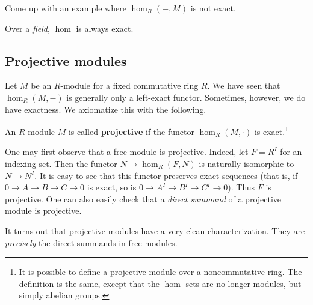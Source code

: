 \begin{exercise}
Come up with an example where $\hom_R(-, M)$ is not exact.
\end{exercise}

\begin{exercise}
Over a \emph{field}, $\hom$ is always exact.
\end{exercise}

\subsection{Projective modules}

Let $M$ be an $R$-module for a fixed commutative ring $R$. We have seen that
$\hom_R(M,-)$ is generally only a left-exact functor.
Sometimes, however, we do have exactness. We axiomatize this with the
following.

\begin{definition}
An $R$-module $M$ is called \textbf{projective} if the functor $\hom_R(M,
\cdot)$ is
exact.\footnote{It is possible to define a projective module over a
noncommutative ring. The definition is the same, except that the $\hom$-sets
are no longer modules, but simply abelian groups. }
\end{definition}

One may first observe that a free module is projective.
Indeed, let $F = R^I$ for an indexing set. Then the functor $N \to \hom_R(F,
N)$ is
naturally
isomorphic to $N \to N^I$. It is easy to see that this functor preserves
exact sequences (that is, if $0 \to A \to B \to C \to 0$ is exact, so is $0
\to A^I \to B^I \to C^I \to 0$).
Thus $F$ is projective.
One can also easily check that a \emph{direct summand} of a projective module
is projective.

It turns out that projective modules have a very clean characterization. They
are  \emph{precisely} the direct
summands in free modules.

